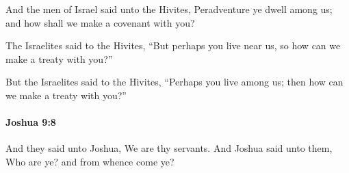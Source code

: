 			\begin{versebox}
					\item[BHS] 
					\item[ASV] And the men of Israel said unto the Hivites, Peradventure ye dwell among us; and how shall we make a covenant with you?
					\item[NIV] The Israelites said to the Hivites, “But perhaps you live near us, so how can we make a treaty with you?”
					\item[NRSV] But the Israelites said to the Hivites, “Perhaps you live among us; then how can we make a treaty with you?”
			\end{versebox}

		\paragraph{Joshua 9:8} %
			\label{JOSHUA-9-8}

			And they said unto Joshua, We are thy servants. And Joshua said unto them, Who are ye? and from whence come ye?

